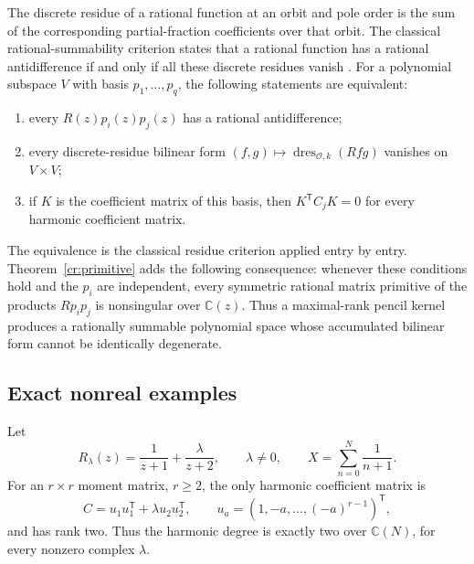 The discrete residue of a rational function at an orbit and pole
order is the sum of the corresponding partial-fraction coefficients
over that orbit.  The classical rational-summability criterion states
that a rational function has a rational antidifference if and only if
all these discrete residues vanish \cite[Proposition~2.5]{ChenSinger2012}.
For a polynomial subspace $V$ with basis $p_1,\ldots,p_q$, the
following statements are equivalent:
\begin{enumerate}
\item every $R(z)p_i(z)p_j(z)$ has a rational antidifference;
\item every discrete-residue bilinear form
$(f,g)\mapsto\operatorname{dres}_{\mathcal O,k}(Rfg)$ vanishes
on $V\times V$;
\item if $K$ is the coefficient matrix of this basis, then
$K^{\mathsf T}C_jK=0$ for every harmonic coefficient matrix.
\end{enumerate}
The equivalence is the classical residue criterion applied entry by
entry.  Theorem~\ref{cr:primitive} adds the following consequence:
whenever these conditions hold and the $p_i$ are independent, every
symmetric rational matrix primitive of the products $Rp_ip_j$ is
nonsingular over $\mathbb C(z)$.  Thus a maximal-rank pencil kernel
produces a rationally summable polynomial space whose accumulated
bilinear form cannot be identically degenerate.

\subsection{Exact nonreal examples}

Let
\[
 R_\lambda(z)=\frac1{z+1}+\frac\lambda{z+2},\qquad\lambda\ne0,
 \qquad X=\sum_{n=0}^N\frac1{n+1}.
\]
For an $r\times r$ moment matrix, $r\ge2$, the only harmonic
coefficient matrix is
\[
 C=u_1u_1^{\mathsf T}+\lambda u_2u_2^{\mathsf T},\qquad
 u_a=(1,-a,\ldots,(-a)^{r-1})^{\mathsf T},
\]
and has rank two.  Thus the harmonic degree is exactly two over
$\mathbb C(N)$, for every nonzero complex $\lambda$.

